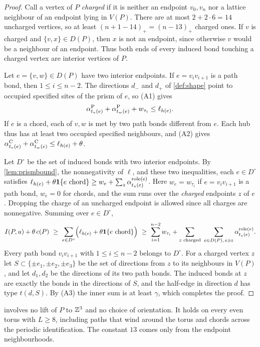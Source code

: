 \begin{proof}
Call a vertex of $P$ \emph{charged} if it is neither an endpoint $v_0,v_n$ nor a lattice neighbour of an endpoint lying in $V(P)$. There are at most $2+2\cdot6=14$ uncharged vertices, so at least $(n+1-14)_+=(n-13)_+$ charged ones. If $v$ is charged and $\{v,x\}\in D(P)$, then $x$ is not an endpoint, since otherwise $v$ would be a neighbour of an endpoint. Thus both ends of every induced bond touching a charged vertex are interior vertices of $P$.

Let $e=\{v,w\}\in D(P)$ have two interior endpoints. If $e=v_iv_{i+1}$ is a path bond, then $1\le i\le n-2$. The directions $d_-$ and $d_+$ of \cref{def:shape} point to occupied specified sites of the prism of $e$, so (A1) gives
\begin{equation}\label{eq:pathrow}
 \alpha^{\rm P}_{t_v(e)}+\alpha^{\rm P}_{t_w(e)}+w_{\tau_i}\le\ell_{h(e)}.
\end{equation}
If $e$ is a chord, each of $v,w$ is met by two path bonds different from $e$. Each hub thus has at least two occupied specified neighbours, and (A2) gives $\alpha^{\rm C}_{t_v(e)}+\alpha^{\rm C}_{t_w(e)}\le\ell_{h(e)}+\theta$.

Let $D^\circ$ be the set of induced bonds with two interior endpoints. By \cref{lem:prismbound}, the nonnegativity of $\ell$, and these two inequalities, each $e\in D^\circ$ satisfies $\ell_{h(e)}+\theta\mathbf 1\{e\text{ chord}\}\ge w_e+\sum_{z}\alpha_{t_z(e)}^{\rm role(e)}$. Here $w_e=w_{\tau_i}$ if $e=v_iv_{i+1}$ is a path bond, $w_e=0$ for chords, and the sum runs over the \emph{charged} endpoints $z$ of $e$. Dropping the charge of an uncharged endpoint is allowed since all charges are nonnegative. Summing over $e\in D^\circ$,
\[
 I(P,u)+\theta\,c(P)\ \ge\ \sum_{e\in D^\circ}\Bigl(\ell_{h(e)}+\theta\mathbf 1\{e\text{ chord}\}\Bigr)
 \ \ge\ \sum_{i=1}^{n-2}w_{\tau_i}+\sum_{z\text{ charged}}\ \sum_{e\in D(P),\,e\ni z}\alpha^{\mathrm{role}(e)}_{t_z(e)} .
\]
Every path bond $v_iv_{i+1}$ with $1\le i\le n-2$ belongs to $D^\circ$. For a charged vertex $z$ let $S\subset\{\pm e_1,\pm e_2,\pm e_3\}$ be the set of directions from $z$ to its neighbours in $V(P)$, and let $d_1,d_2$ be the directions of its two path bonds. The induced bonds at $z$ are exactly the bonds in the directions of $S$, and the half-edge in direction $d$ has type $t(d,S)$. By (A3) the inner sum is at least $\gamma$, which completes the proof.
\end{proof}

\begin{remark}
 involves no lift of $P$ to $\mathbb Z^3$ and no choice of orientation. It holds on every even torus with $L\ge8$, including paths that wind around the torus and chords across the periodic identification. The constant $13$ comes only from the endpoint neighbourhoods.
\end{remark}

